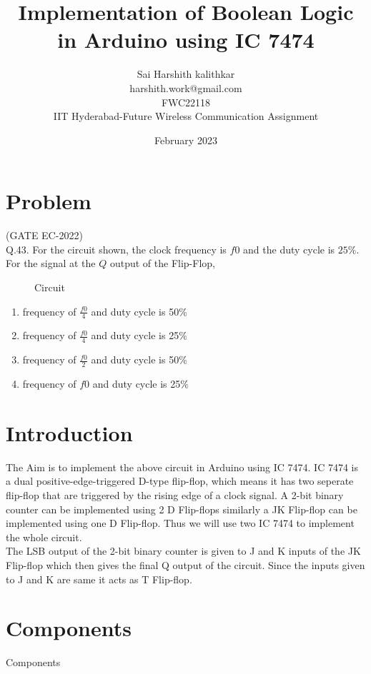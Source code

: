 \documentclass{article}
\title{Implementation of Boolean Logic in Arduino using IC 7474}
\date{February 2023}
\author{Sai Harshith kalithkar\\harshith.work@gmail.com\\FWC22118\\IIT Hyderabad-Future Wireless Communication Assignment}
\begin{document}
\maketitle
	\tableofcontents

\section{Problem}
	(GATE EC-2022)\\
	Q.43. For the circuit shown, the clock frequency is $f0$ and the duty cycle is $25 \%$. For the signal at the $Q$ output of the Flip-Flop,
\\
	\begin{figure}[h]
		\centering
	
		\caption{Circuit}
		\label{fig:1}
	\end{figure}

\begin{enumerate}
	\item frequency of $\frac{f0}{4}$ and duty cycle is 50$\%$
	\item frequency of $\frac{f0}{4}$ and duty cycle is 25$\%$
	\item frequency of $\frac{f0}{2}$ and duty cycle is 50$\%$
	\item frequency of $f0$ and duty cycle is 25$\%$ \\
\end{enumerate}

\section{Introduction}
		The Aim is to implement the above circuit in Arduino using IC 7474. IC 7474 is a dual positive-edge-triggered D-type flip-flop, which means it has two seperate flip-flop that are triggered by the rising edge of a clock signal. A 2-bit binary counter can be implemented using 2 D Flip-flops similarly a JK Flip-flop can be implemented using one D Flip-flop. Thus we will use two IC 7474 to implement the whole circuit.\\

		The LSB output of the 2-bit binary counter is given to J and K inputs of the JK Flip-flop which then gives the final Q output of the circuit. Since the inputs given to J and K are same it acts as T Flip-flop.\\
\section{Components}
	\begin{table}[h]
		\begin{center}
			
			\caption{Components}
			\label{table:0}
		\end{center}
	\end{table}
\pagebreak
\end{document}
